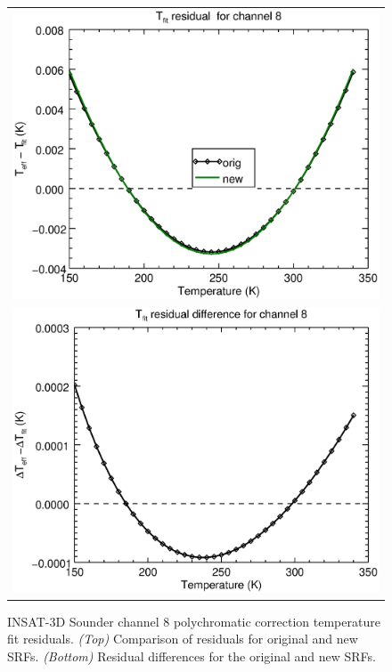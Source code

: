 \begin{figure}[H]
  \centering
  \begin{tabular}{c}
    \includegraphics[scale=0.55]{graphics/sndr/tfit/sndr_insat3d-8.tfit.eps} \\
    \includegraphics[scale=0.55]{graphics/sndr/tfit/sndr_insat3d-8.tfit.difference.eps}
  \end{tabular}
  \caption{INSAT-3D Sounder channel 8 polychromatic correction temperature fit residuals. \emph{(Top)} Comparison of residuals for original and new SRFs. \emph{(Bottom)} Residual differences for the original and new SRFs.}
  \label{fig:sndr_ch8_tfit}
\end{figure}


